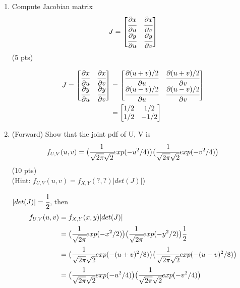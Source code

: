 \documentclass[a4paper]{article}
\theoremstyle{definition}
\newenvironment{soln}{
	\leavevmode\color{blue}\ignorespaces
}{}
\begin{document}
	\begin{enumerate}[label=(\alph*)]
		\item Compute Jacobian matrix $$J=\begin{bmatrix}
			\cfrac{\partial x}{\partial u} & \cfrac{\partial x}{\partial v}\\
			\cfrac{\partial y}{\partial u} & \cfrac{\partial y}{\partial v}
		\end{bmatrix}
		$$
		\hfill (5 pts)
		
		\begin{soln}  
			\begin{align*}
				J=\begin{bmatrix}
					\cfrac{\partial x}{\partial u} & \cfrac{\partial x}{\partial v}\\
					\cfrac{\partial y}{\partial u} & \cfrac{\partial y}{\partial v}
				\end{bmatrix}
				&=\begin{bmatrix}
					\cfrac{\partial (u+v)/2}{\partial u} & \cfrac{\partial (u+v)/2}{\partial v}\\
					\cfrac{\partial (u-v)/2}{\partial u} & \cfrac{\partial (u-v)/2}{\partial v}
				\end{bmatrix}
				\\
				&=\begin{bmatrix}
					1/2 & 1/2\\
					1/2 & -1/2
				\end{bmatrix}
			\end{align*}
		\end{soln}
		
		
		\item (Forward) Show that the joint pdf of U, V is
		$$f_{U, V}(u, v)=\big (\cfrac{1}{\sqrt{2\pi}\sqrt{2}}exp(-u^{2}/4)\big ) \big (\cfrac{1}{\sqrt{2\pi}\sqrt{2}}exp(-v^{2}/4)\big )$$
		\hfill (10 pts) \\
		(Hint: $f_{U, V}(u, v)=f_{X, Y}(?, ?)|det(J)|$) \\
		
		\begin{soln}  
			$|det(J)|=\cfrac{1}{2}$, then
			\begin{align*}
				f_{U, V}(u, v)&=f_{X, Y}(x, y)|det(J)|\\
				&=\big (\cfrac{1}{\sqrt{2\pi}}exp(-x^{2}/2)\big ) \big (\cfrac{1}{\sqrt{2\pi}}exp(-y^{2}/2)\big )\cfrac{1}{2}\\
				&=\big (\cfrac{1}{\sqrt{2\pi}\sqrt{2}}exp(-(u+v)^{2}/8)\big ) \big (\cfrac{1}{\sqrt{2\pi}\sqrt{2}}exp(-(u-v)^{2}/8)\big )\\
				&=\big (\cfrac{1}{\sqrt{2\pi}\sqrt{2}}exp(-u^{2}/4)\big ) \big (\cfrac{1}{\sqrt{2\pi}\sqrt{2}}exp(-v^{2}/4)\big )
			\end{align*}
		\end{soln}
		

\end{enumerate}
\end{document}
